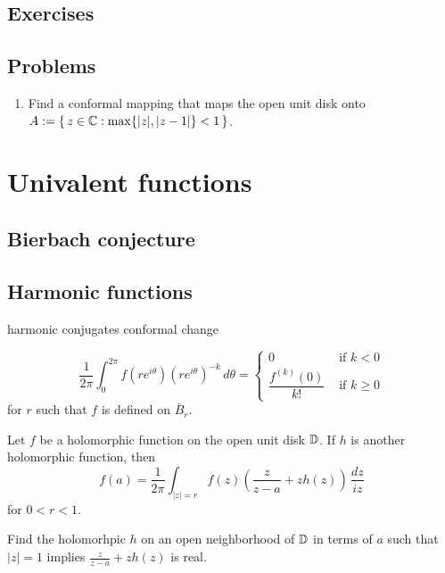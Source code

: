 \documentclass{../../large}
\begin{document}
\section*{Exercises}
\begin{prb}
\end{prb}
\begin{prb}
\end{prb}

\section*{Problems}
\begin{enumerate}
\item Find a conformal mapping that maps the open unit disk onto $A:=\{\,z\in\mathbb{C}:\max\{|z|,|z-1|\}<1\,\}$.
\end{enumerate}




\chapter{Univalent functions}
\section{Bierbach conjecture}
\section{Harmonic functions}
harmonic conjugates
conformal change

\begin{prb}
\[\frac1{2\pi}\int_0^{2\pi}f(re^{i\theta})(re^{i\theta})^{-k}\,d\theta
=\begin{cases}0&\text{ if }k<0\\\dfrac{f^{(k)}(0)}{k!}&\text{ if }k\ge0\end{cases}\]
for $r$ such that $f$ is defined on $\bar B_r$.
\end{prb}
\begin{prb}
Let $f$ be a holomorphic function on the open unit disk $\mathbb{D}$.
If $h$ is another holomorphic function, then
\[f(a)=\frac1{2\pi}\int_{|z|=r}f(z)\left(\frac z{z-a}+zh(z)\right)\,\frac{dz}{iz}\]
for $0<r<1$.
\begin{parts}
\item Find the holomorhpic $h$ on an open neighborhood of $\mathbb{D}$ in terms of $a$ such that $|z|=1$ implies $\frac z{z-a}+zh(z)$ is real.
\end{parts}
\end{prb}
\end{document}
